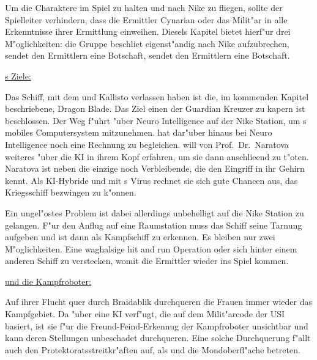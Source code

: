 \begin{remarks}
	Um die Charaktere im Spiel zu halten und nach Nike zu fliegen, sollte der Spielleiter verhindern, dass die Ermittler Cynarian oder das Milit"ar in alle Erkenntnisse ihrer Ermittlung einweihen. Diesels Kapitel bietet hierf"ur drei M"oglichkeiten: die Gruppe beschlie\3t eigenst"andig nach Nike aufzubrechen, \xl{} sendet den Ermittlern eine Botschaft, \ml{} sendet den Ermittlern eine Botschaft.

	\underline{\xl{}s Ziele:}

	Das Schiff, mit dem \xl{} und \ml{} Kallisto verlassen haben ist die, im kommenden Kapitel beschriebene, Dragon Blade. Das Ziel einen der Guardian Kreuzer zu kapern ist beschlossen. Der Weg f"uhrt "uber Neuro Intelligence auf der Nike Station, um \ml{}s mobiles Computersystem mitzunehmen. \xl{} hat dar"uber hinaus bei Neuro Intelligence noch eine Rechnung zu begleichen. \xl{} will von Prof.~Dr.~Naratova weiteres "uber die KI in ihrem Kopf erfahren, um sie dann anschlie\3end zu t"oten. Naratova ist neben \ml{} die einzige noch Verbleibende, die den Eingriff in ihr Gehirn kennt. Als KI-Hybride und mit \ml{}s Virus rechnet sie sich gute Chancen aus, das Kriegsschiff bezwingen zu k"onnen. 
	
	Ein ungel"ostes Problem ist dabei allerdings unbehelligt auf die Nike Station zu gelangen. F"ur den Anflug auf eine Raumstation muss das Schiff seine Tarnung aufgeben und ist dann als Kampfschiff zu erkennen. Es bleiben nur zwei M"oglichkeiten. Eine waghalsige hit and run Operation oder sich hinter einem anderen Schiff zu verstecken, womit die Ermittler wieder ins Spiel kommen.

	\underline{\xl{} und die Kampfroboter:}

	Auf ihrer Flucht quer durch Braidablik durchqueren die Frauen immer wieder das Kampfgebiet. Da \xl{} "uber eine KI verf"ugt, die auf dem Milit"arcode der USI basiert, ist sie f"ur die Freund-Feind-Erkennug der Kampfroboter unsichtbar und kann deren Stellungen unbeschadet durchqueren. Eine solche Durchquerung f"allt auch den Protektoratsstreitkr"aften auf, als \xl{} und \ml{} die Mondoberfl"ache betreten. 
\end{remarks}
\vfill
